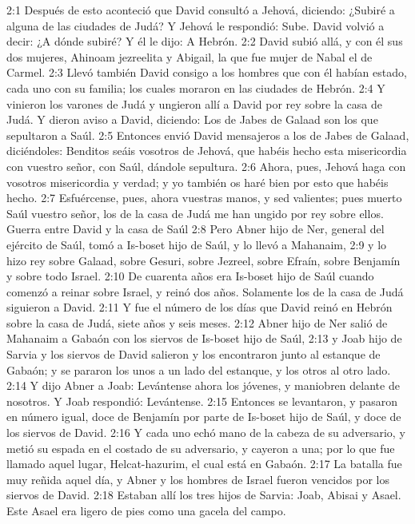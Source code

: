 2:1 Después de esto aconteció que David consultó a Jehová, diciendo: ¿Subiré a alguna de las ciudades de Judá? Y Jehová le respondió: Sube. David volvió a decir: ¿A dónde subiré? Y él le dijo: A Hebrón. 
2:2 David subió allá, y con él sus dos mujeres, Ahinoam jezreelita y Abigail, la que fue mujer de Nabal el de Carmel. 
2:3 Llevó también David consigo a los hombres que con él habían estado, cada uno con su familia; los cuales moraron en las ciudades de Hebrón.  
2:4 Y vinieron los varones de Judá y ungieron allí a David por rey sobre la casa de Judá. Y dieron aviso a David, diciendo: Los de Jabes de Galaad son los que sepultaron a Saúl.  
2:5 Entonces envió David mensajeros a los de Jabes de Galaad, diciéndoles: Benditos seáis vosotros de Jehová, que habéis hecho esta misericordia con vuestro señor, con Saúl, dándole sepultura. 
2:6 Ahora, pues, Jehová haga con vosotros misericordia y verdad; y yo también os haré bien por esto que habéis hecho.  
2:7 Esfuércense, pues, ahora vuestras manos, y sed valientes; pues muerto Saúl vuestro señor, los de la casa de Judá me han ungido por rey sobre ellos.  
Guerra entre David y la casa de Saúl  
2:8 Pero Abner hijo de Ner, general del ejército de Saúl, tomó a Is-boset hijo de Saúl, y lo llevó a Mahanaim,  
2:9 y lo hizo rey sobre Galaad, sobre Gesuri, sobre Jezreel, sobre Efraín, sobre Benjamín y sobre todo Israel.  
2:10 De cuarenta años era Is-boset hijo de Saúl cuando comenzó a reinar sobre Israel, y reinó dos años. Solamente los de la casa de Judá siguieron a David.  
2:11 Y fue el número de los días que David reinó en Hebrón sobre la casa de Judá, siete años y seis meses.  
2:12 Abner hijo de Ner salió de Mahanaim a Gabaón con los siervos de Is-boset hijo de Saúl,  
2:13 y Joab hijo de Sarvia y los siervos de David salieron y los encontraron junto al estanque de Gabaón; y se pararon los unos a un lado del estanque, y los otros al otro lado.  
2:14 Y dijo Abner a Joab: Levántense ahora los jóvenes, y maniobren delante de nosotros. Y Joab respondió: Levántense.  
2:15 Entonces se levantaron, y pasaron en número igual, doce de Benjamín por parte de Is-boset hijo de Saúl, y doce de los siervos de David.  
2:16 Y cada uno echó mano de la cabeza de su adversario, y metió su espada en el costado de su adversario, y cayeron a una; por lo que fue llamado aquel lugar, Helcat-hazurim, el cual está en Gabaón.  
2:17 La batalla fue muy reñida aquel día, y Abner y los hombres de Israel fueron vencidos por los siervos de David.  
2:18 Estaban allí los tres hijos de Sarvia: Joab, Abisai y Asael. Este Asael era ligero de pies como una gacela del campo.  
